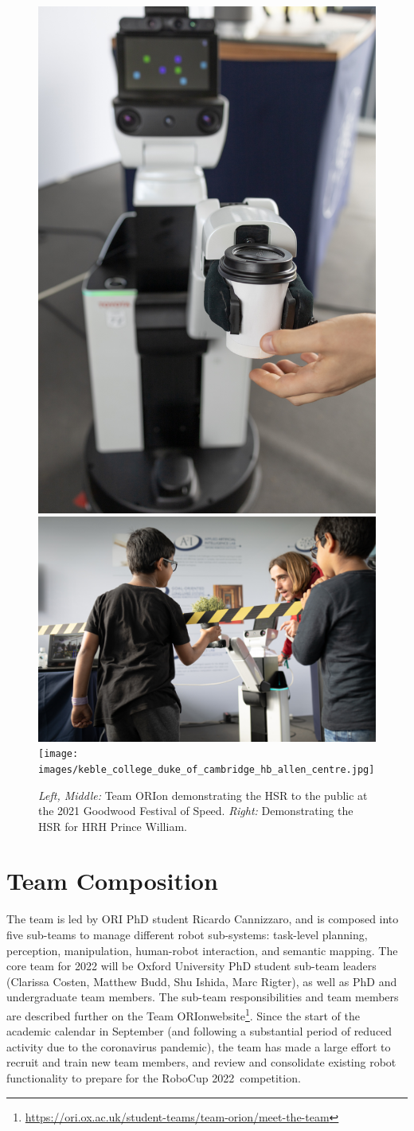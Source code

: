 \documentclass[runningheads,a4paper]{llncs}
\newcommand{\teamori}{Team ORIon}
\newcommand{\competitionyear}{2022}
\newcommand{\robocuptitleshort}{RoboCup \competitionyear}
\begin{document}
\begin{figure}[tb]
	\begin{center}
		\includegraphics[width=.20\columnwidth, clip, trim=0 0ex 0ex 0ex]{images/goodwood_hsr_coffee.jpg}
		\includegraphics[width=.39\columnwidth, clip, trim=20ex 0ex 0ex 0ex]{images/goodwood_demo_with_child.jpg}
		\texttt{[image: images/keble\_college\_duke\_of\_cambridge\_hb\_allen\_centre.jpg]}
	\end{center} 
	\caption{\emph{Left, Middle:} Team ORIon demonstrating the HSR to the public at the 2021 Goodwood Festival of Speed. \emph{Right:} Demonstrating the HSR for HRH Prince William.}
	\label{fig:outreach}
\end{figure}


\section{Team Composition}
The team is led by ORI PhD student Ricardo Cannizzaro, and is composed into five sub-teams to manage different robot sub-systems: task-level planning, perception, manipulation, human-robot interaction, and semantic mapping. The core team for 2022 will be Oxford University PhD student sub-team leaders (Clarissa Costen, Matthew Budd, Shu Ishida, Marc Rigter), as well as PhD and undergraduate team members. The sub-team responsibilities and team members are described further on the \teamori website\footnote{\url{https://ori.ox.ac.uk/student-teams/team-orion/meet-the-team}}.
Since the start of the academic calendar in September (and following a substantial period of reduced activity due to the coronavirus pandemic), the team has made a large effort to recruit and train new team members, and review and consolidate existing robot functionality to prepare for the \robocuptitleshort\ competition. 
\end{document}
